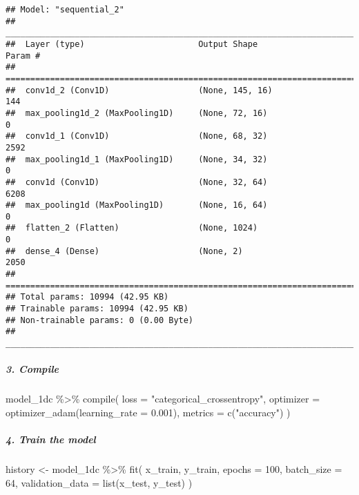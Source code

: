 \documentclass[
]{article}
\newenvironment{Shaded}{\begin{snugshade}}{\end{snugshade}}
\newcommand{\AttributeTok}[1]{\textcolor[rgb]{0.77,0.63,0.00}{#1}}
\newcommand{\DecValTok}[1]{\textcolor[rgb]{0.00,0.00,0.81}{#1}}
\newcommand{\FloatTok}[1]{\textcolor[rgb]{0.00,0.00,0.81}{#1}}
\newcommand{\FunctionTok}[1]{\textcolor[rgb]{0.00,0.00,0.00}{#1}}
\newcommand{\NormalTok}[1]{#1}
\newcommand{\OtherTok}[1]{\textcolor[rgb]{0.56,0.35,0.01}{#1}}
\newcommand{\SpecialCharTok}[1]{\textcolor[rgb]{0.00,0.00,0.00}{#1}}
\newcommand{\StringTok}[1]{\textcolor[rgb]{0.31,0.60,0.02}{#1}}
\begin{document}
\begin{verbatim}
## Model: "sequential_2"
## ________________________________________________________________________________
##  Layer (type)                       Output Shape                    Param #     
## ================================================================================
##  conv1d_2 (Conv1D)                  (None, 145, 16)                 144         
##  max_pooling1d_2 (MaxPooling1D)     (None, 72, 16)                  0           
##  conv1d_1 (Conv1D)                  (None, 68, 32)                  2592        
##  max_pooling1d_1 (MaxPooling1D)     (None, 34, 32)                  0           
##  conv1d (Conv1D)                    (None, 32, 64)                  6208        
##  max_pooling1d (MaxPooling1D)       (None, 16, 64)                  0           
##  flatten_2 (Flatten)                (None, 1024)                    0           
##  dense_4 (Dense)                    (None, 2)                       2050        
## ================================================================================
## Total params: 10994 (42.95 KB)
## Trainable params: 10994 (42.95 KB)
## Non-trainable params: 0 (0.00 Byte)
## ________________________________________________________________________________
\end{verbatim}

\hypertarget{compile-2}{%
\subparagraph{3. Compile}\label{compile-2}}

\begin{Shaded}
\begin{Highlighting}[]
\NormalTok{model\_1dc }\SpecialCharTok{\%\textgreater{}\%} \FunctionTok{compile}\NormalTok{(}
  \AttributeTok{loss =} \StringTok{"categorical\_crossentropy"}\NormalTok{,}
  \AttributeTok{optimizer =} \FunctionTok{optimizer\_adam}\NormalTok{(}\AttributeTok{learning\_rate =} \FloatTok{0.001}\NormalTok{),}
  \AttributeTok{metrics =} \FunctionTok{c}\NormalTok{(}\StringTok{"accuracy"}\NormalTok{)}
\NormalTok{)}
\end{Highlighting}
\end{Shaded}

\hypertarget{train-the-model-2}{%
\subparagraph{4. Train the model}\label{train-the-model-2}}

\begin{Shaded}
\begin{Highlighting}[]
\NormalTok{history }\OtherTok{\textless{}{-}}\NormalTok{ model\_1dc }\SpecialCharTok{\%\textgreater{}\%} \FunctionTok{fit}\NormalTok{(}
\NormalTok{  x\_train, y\_train,}
  \AttributeTok{epochs =} \DecValTok{100}\NormalTok{,}
  \AttributeTok{batch\_size =} \DecValTok{64}\NormalTok{,}
  \AttributeTok{validation\_data =} \FunctionTok{list}\NormalTok{(x\_test, y\_test)}
\NormalTok{)}
\end{Highlighting}
\end{Shaded}
\end{document}
